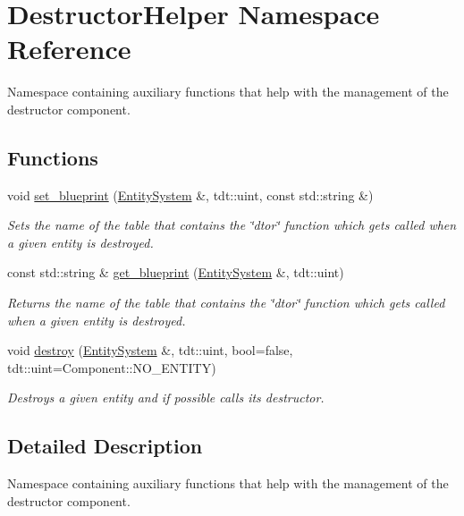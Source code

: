 \hypertarget{namespace_destructor_helper}{}\section{Destructor\+Helper Namespace Reference}
\label{namespace_destructor_helper}


Namespace containing auxiliary functions that help with the management of the destructor component.  


\subsection*{Functions}
\begin{DoxyCompactItemize}
\item 
void \hyperlink{namespace_destructor_helper_ad2e431895911bcc6b068bc5c52f58863}{set\+\_\+blueprint} (\hyperlink{class_entity_system}{Entity\+System} \&, tdt\+::uint, const std\+::string \&)
\begin{DoxyCompactList}\small\item\em Sets the name of the table that contains the \char`\"{}dtor\char`\"{} function which get\textquotesingle{}s called when a given entity is destroyed. \end{DoxyCompactList}\item 
const std\+::string \& \hyperlink{namespace_destructor_helper_a981a9611f3ba186880b24d1c235035ed}{get\+\_\+blueprint} (\hyperlink{class_entity_system}{Entity\+System} \&, tdt\+::uint)
\begin{DoxyCompactList}\small\item\em Returns the name of the table that contains the \char`\"{}dtor\char`\"{} function which get\textquotesingle{}s called when a given entity is destroyed. \end{DoxyCompactList}\item 
void \hyperlink{namespace_destructor_helper_a93b8f71a2769c231679141fcef275bdb}{destroy} (\hyperlink{class_entity_system}{Entity\+System} \&, tdt\+::uint, bool=false, tdt\+::uint=Component\+::\+N\+O\+\_\+\+E\+N\+T\+I\+TY)
\begin{DoxyCompactList}\small\item\em Destroys a given entity and if possible calls it\textquotesingle{}s destructor. \end{DoxyCompactList}\end{DoxyCompactItemize}


\subsection{Detailed Description}
Namespace containing auxiliary functions that help with the management of the destructor component. 

